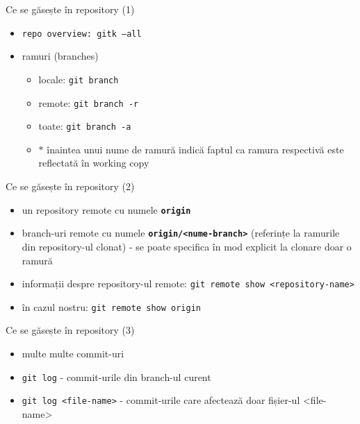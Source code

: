 \documentclass{beamer}
\begin{document}
\begin{frame}{Ce se găsește în repository (1)}
\begin{itemize} %
\item \texttt{repo overview: gitk --all}
\\
\pause\item ramuri (branches)
\begin{itemize}
	\item locale: \texttt{git branch}
	\item remote: \texttt{git branch -r}
	\item toate: \texttt{git branch -a}
	\item $*$ înaintea unui nume de ramură indică faptul ca ramura respectivă este reflectată în working copy
\end{itemize}
\end{itemize}
\end{frame}

\begin{frame}{Ce se găsește în repository (2)}
\begin{itemize} %
\item un repository remote cu numele \texttt{\textbf{origin}}
\item branch-uri remote cu numele \textbf{\texttt{origin/<nume-branch>}} (referințe la ramurile din repository-ul clonat) - se poate specifica în mod explicit la clonare doar o ramură
\\
\item informații despre repository-ul remote: \texttt{git remote show <repository-name>}
\item în cazul nostru: \texttt{git remote show origin}
\end{itemize}
\end{frame}

\begin{frame}{Ce se găsește în repository (3)}
\begin{itemize} %
\item multe multe commit-uri
\item \texttt{git log} - commit-urile din branch-ul curent
\item \texttt{git log <file-name>} - commit-urile care afectează doar fișier-ul <file-name>
\end{itemize}
\end{frame}
\end{document}
